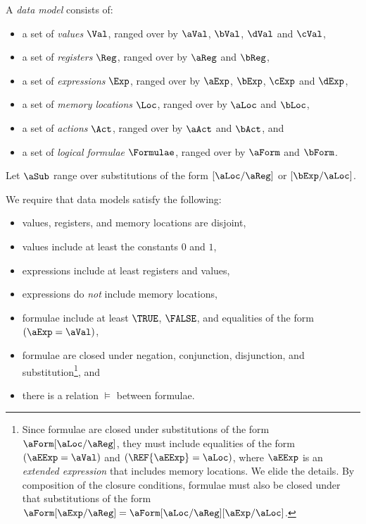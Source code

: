 A \emph{data model} consists of:
\begin{itemize}
\item a set of \emph{values} $\Val$, ranged over by
  $\aVal$, $\bVal$, $\dVal$ and $\cVal$,
\item a set of \emph{registers} $\Reg$, ranged over by
  $\aReg$ and $\bReg$,
\item a set of \emph{expressions} $\Exp$, ranged over by
  $\aExp$, $\bExp$, $\cExp$ and $\dExp$,
\item a set of \emph{memory locations} $\Loc$, ranged over by $\aLoc$ and
  $\bLoc$, 
\item a set of \emph{actions} $\Act$, ranged over by $\aAct$ and $\bAct$, and
\item a set of \emph{logical formulae} $\Formulae$, ranged over by
  $\aForm$ and $\bForm$.
\end{itemize}

Let $\aSub$ range over substitutions of the form
$[\aLoc/\aReg]$ or $[\bExp/\aLoc]$.

We require that data models satisfy the following:
\begin{itemize}
\item values, registers, and memory locations are disjoint,
\item values include at least the constants $0$ and $1$,
\item expressions include at least registers and values,
\item expressions do \emph{not} include memory locations, %
\item formulae include at least $\TRUE$, $\FALSE$, and equalities of the form
  $(\aExp=\aVal)$, %
\item formulae are closed under negation, conjunction, disjunction, and
  substitution\footnote{Since formulae are closed under substitutions of the
    form $\aForm[\aLoc/\aReg]$, they must include equalities of the form
    $(\aEExp=\aVal)$ and $(\REF{\aEExp}=\aLoc)$, where $\aEExp$ is an
    \emph{extended expression} that includes memory locations.  We elide the
    details.  By composition of the closure conditions, formulae must also be
    closed under that substitutions of the form
    $\aForm[\aExp/\aReg]=\aForm[\aLoc/\aReg][\aExp/\aLoc]$.}, and
\item there is a relation $\vDash$ between formulae.
\end{itemize}

